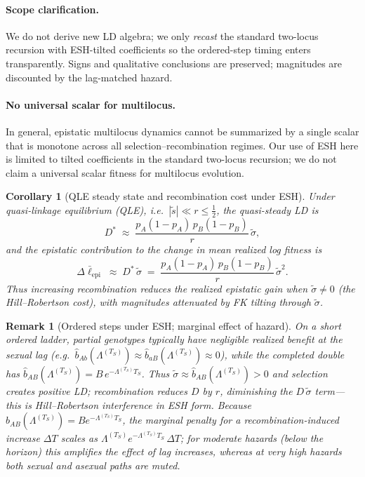 \documentclass[11pt]{article}
\theoremstyle{upright}
\newtheorem{corollary}{Corollary}
\newtheorem{remark}{Remark}
\begin{document}
\paragraph{Scope clarification.}
We do not derive new LD algebra; we only \emph{recast} the standard two-locus recursion with ESH-tilted coefficients so the ordered-step timing enters transparently. Signs and qualitative conclusions are preserved; magnitudes are discounted by the lag-matched hazard.

\paragraph{No universal scalar for multilocus.}
In general, epistatic multilocus dynamics cannot be summarized by a single scalar that is
monotone across all selection–recombination regimes. Our use of ESH here is limited to
tilted coefficients in the standard two-locus recursion; we do not claim a universal scalar
fitness for multilocus evolution.

\begin{corollary}[QLE steady state and recombination cost under ESH]\label{cor:QLE}
Under quasi-linkage equilibrium (QLE), i.e.\ $|\tilde s|\ll r\le \tfrac12$, the quasi-steady LD is
\[
D^{\ast} \;\approx\; \frac{p_A(1-p_A)\,p_B(1-p_B)}{r}\,\tilde\sigma,
\]
and the epistatic contribution to the change in mean realized log fitness is
\[
\Delta \bar\ell_{\mathrm{epi}} \;\approx\; D^{\ast}\,\tilde\sigma \;=\; \frac{p_A(1-p_A)\,p_B(1-p_B)}{r}\,\tilde\sigma^2.
\]
Thus increasing recombination reduces the realized epistatic gain when $\tilde\sigma\neq 0$ (the Hill--Robertson cost), with magnitudes attenuated by FK tilting through $\tilde\sigma$.
\end{corollary}

\begin{remark}[Ordered steps under ESH; marginal effect of hazard]
On a short ordered ladder, partial genotypes typically have negligible realized benefit at the sexual lag (e.g.\ $\widehat b_{Ab}(\Lambda^{(T_S)})\approx \widehat b_{aB}(\Lambda^{(T_S)})\approx 0$),
while the completed double has $\widehat b_{AB}(\Lambda^{(T_S)})=B\,e^{-\Lambda^{(T_S)}T_S}$.
Thus $\tilde\sigma\approx \widehat b_{AB}(\Lambda^{(T_S)})>0$ and selection \emph{creates} positive LD; recombination reduces $D$ by $r$, diminishing the $D\,\tilde\sigma$ term—this is Hill--Robertson interference in ESH form.
Because $\widehat b_{AB}(\Lambda^{(T_S)})=B e^{-\Lambda^{(T_S)}T_S}$, the \emph{marginal} penalty for a recombination-induced increase $\Delta T$ scales as $\Lambda^{(T_S)} e^{-\Lambda^{(T_S)}T_S}\,\Delta T$; for moderate hazards (below the horizon) this amplifies the effect of lag increases, whereas at very high hazards both sexual and asexual paths are muted.
\end{remark}
\end{document}
